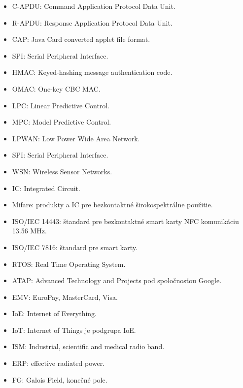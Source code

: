 \documentclass[12pt,a4paper,oneside,openright]{report}
\begin{document}
\begin{itemize}
	\item C-APDU: Command Application Protocol Data Unit.
	\item R-APDU: Response Application Protocol Data Unit.
	\item CAP: Java Card converted applet file format.
	\item SPI: Serial Peripheral Interface.
	\item HMAC: Keyed-hashing message authentication code.
	\item OMAC: One-key CBC MAC.
	\item LPC: Linear Predictive Control.
	\item MPC: Model Predictive Control.
	\item LPWAN: Low Power Wide Area Network.
	\item SPI: Serial Peripheral Interface.	
	\item WSN: Wireless Sensor Networks.
	\item IC: Integrated Circuit.
	\item Mifare: produkty a IC pre bezkontaktné širokospektrálne použitie.
	\item ISO/IEC 14443: štandard pre bezkontaktné smart karty NFC komunikáciu 13.56 MHz.
	\item ISO/IEC 7816: štandard pre smart karty.
	\item RTOS: Real Time Operating System.
	\item ATAP: Advanced Technology and Projects pod spoločnosťou Google.
	\item EMV: EuroPay, MasterCard, Visa.
	\item IoE: Internet of Everything.
	\item IoT: Internet of Things je podgrupa IoE.
	\item ISM: Industrial, scientific and medical radio band.
	\item ERP: effective radiated power.
	\item FG: Galois Field, konečné pole.
\end{itemize}
\onehalfspacing

\listoffigures
\listoftables
\end{document}
